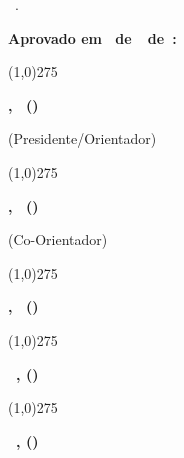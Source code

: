 \begin{folhaaprovacao}
	\setlength{\headheight}{15pt}
	\centering
	{\bfseries\autor}\par
	\vspace{98pt}			%
	\singlespacing
	\textsc{\bfseries\tituloTrabalho}\par

	\vspace{98pt}
	\begin{adjustwidth}{0.5\textwidth}{}
		\justifying
		\singlespacing
		\textoFolhaRosto\ \textbf{\grauFolhaRosto}.\par
	\end{adjustwidth}

	\vspace{56pt}			%
	\centering
	\vspace{48pt}
	\textbf{Aprovado em \diaDefesa\ de\ \mesDefesa\ de\ \ano:}\par

	\vspace{56pt}
	\linethickness{1.75pt}
	\line(1,0){275}\par
	\textbf{\orientador , \orientadorTitulo\ (\universidadeSigla)}\par
	(Presidente/Orientador)

	\vspace{14pt}
	\line(1,0){275}\par
	\textbf{\bancaUm , \bancaUmTitulo\ (\bancaUmSigla)}\par
	\ifcoorientador
		{(Co-Orientador)}
	\fi

	\vspace{14pt}
	\line(1,0){275}\par
	\textbf{\bancaDois , \bancaDoisTitulo\ (\bancaDoisSigla)}\par

	\ifbancaTresExiste
	{\vspace{14pt}\line(1,0){275}\par
	\textbf{\bancaTres\ , \bancaTresTitulo (\bancaTresSigla)}\par}
	\else
	\fi

	\ifbancaQuatroExiste
	{\vspace{14pt}\line(1,0){275}\par
	\textbf{\bancaQuatro\ , \bancaQuatroTitulo (\bancaQuatroSigla)}\par}
	\else
	\fi

	\vfill
	\cidadeCEP\par
	\ano\par
\end{folhaaprovacao}